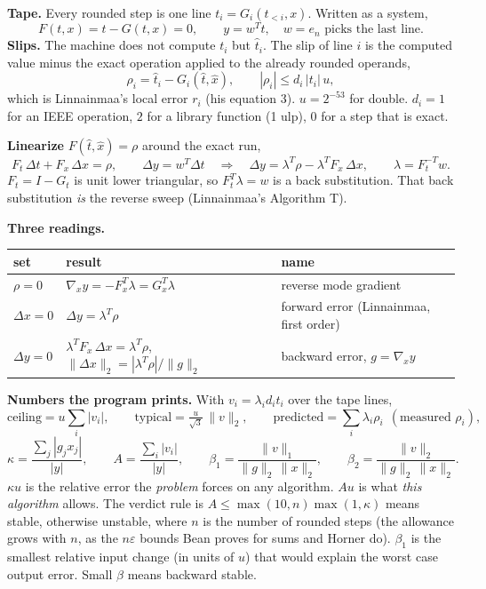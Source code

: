 \documentclass[11pt]{article}
\newcommand{\lam}{\lambda}
\begin{document}
\begin{recall}
\textbf{Tape.} Every rounded step is one line $t_i = G_i(t_{<i}, x)$. Written as a system,
\[
F(t,x) = t - G(t,x) = 0, \qquad y = w^{T} t, \quad w = e_n \text{ picks the last line}.
\]
\textbf{Slips.} The machine does not compute $t_i$ but $\hat t_i$. The slip of line $i$ is the computed value minus the exact operation applied to the already rounded operands,
\[
\rho_i = \hat t_i - G_i(\hat t, \hat x), \qquad |\rho_i| \le d_i\,|t_i|\,u ,
\]
which is Linnainmaa's local error $r_i$ (his equation 3). $u = 2^{-53}$ for double. $d_i = 1$ for an IEEE operation, $2$ for a library function (1 ulp), $0$ for a step that is exact.

\textbf{Linearize} $F(\hat t,\hat x) = \rho$ around the exact run,
\[
F_t\,\Delta t + F_x\,\Delta x = \rho, \qquad \Delta y = w^{T}\Delta t
\quad\Longrightarrow\quad
\Delta y = \lam^{T}\rho - \lam^{T}F_x\,\Delta x, \qquad \lam = F_t^{-T} w .
\]
$F_t = I - G_t$ is unit lower triangular, so $F_t^{T}\lam = w$ is a back substitution. That back substitution \emph{is} the reverse sweep (Linnainmaa's Algorithm T).

\textbf{Three readings.}
\begin{center}
\begin{tabular}{@{}lll@{}}
\toprule
set & result & name \\
\midrule
$\rho = 0$ & $\nabla_x y = -F_x^{T}\lam = G_x^{T}\lam$ & reverse mode gradient \\
$\Delta x = 0$ & $\Delta y = \lam^{T}\rho$ & forward error (Linnainmaa, first order) \\
$\Delta y = 0$ & $\lam^{T}F_x\,\Delta x = \lam^{T}\rho$, \ $\|\Delta x\|_2 = |\lam^{T}\rho| / \|g\|_2$ & backward error, $g = \nabla_x y$ \\
\bottomrule
\end{tabular}
\end{center}

\textbf{Numbers the program prints.} With $v_i = \lam_i d_i t_i$ over the tape lines,
\[
\text{ceiling} = u\sum_i |v_i|,\qquad
\text{typical} = \tfrac{u}{\sqrt 3}\,\|v\|_2,\qquad
\text{predicted} = \sum_i \lam_i \rho_i \ \ (\text{measured } \rho_i),
\]
\[
\kappa = \frac{\sum_j |g_j x_j|}{|y|},\qquad
A = \frac{\sum_i |v_i|}{|y|},\qquad
\beta_1 = \frac{\|v\|_1}{\|g\|_2\,\|x\|_2},\qquad
\beta_2 = \frac{\|v\|_2}{\|g\|_2\,\|x\|_2}.
\]
$\kappa u$ is the relative error the \emph{problem} forces on any algorithm. $A u$ is what \emph{this algorithm} allows. The verdict rule is $A \le \max(10, n)\max(1,\kappa)$ means stable, otherwise unstable, where $n$ is the number of rounded steps (the allowance grows with $n$, as the $n\varepsilon$ bounds Bean proves for sums and Horner do). $\beta_1$ is the smallest relative input change (in units of $u$) that would explain the worst case output error. Small $\beta$ means backward stable.
\end{recall}
\end{document}

